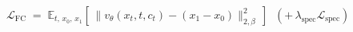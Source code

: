 \documentclass[border=10pt,varwidth=\maxdimen]{standalone}
\begin{document}
\(\displaystyle \mathcal{L}_{\mathrm{FC}} \;=\; \mathbb{E}_{t,\,x_0,\,x_1}\!\left[\,\big\lVert v_\theta(x_t, t, c_t) - (x_1 - x_0) \big\rVert_{2,\beta}^2\,\right] \;\;(+\,\lambda_{\mathrm{spec}}\mathcal{L}_{\mathrm{spec}}) \)
\end{document}
